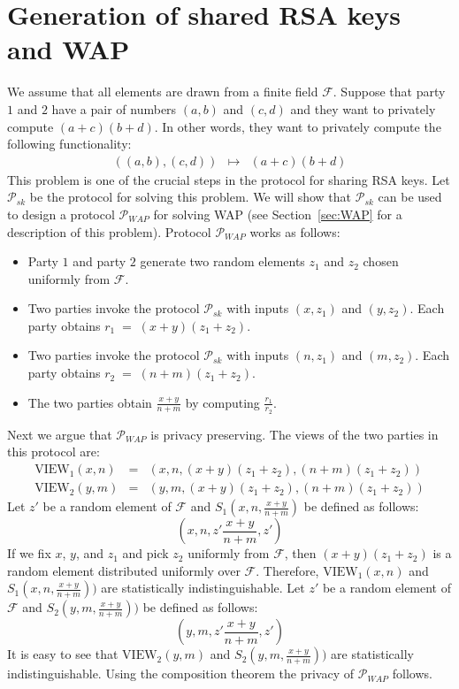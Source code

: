 
\section{Generation of shared RSA keys and WAP}
\label{sec:shared-RSA}

We assume that all elements are drawn from a finite field
$\mathcal{F}$.  Suppose that party $1$ and $2$ have a pair of numbers
$(a,b)$ and $(c,d)$ and they want to privately compute
$(a+c)(b+d)$. In other words, they want to privately compute the
following functionality:
\begin{eqnarray*}
((a,b),(c,d)) & \longmapsto & (a+c)(b+d)
\end{eqnarray*}
This problem is one of the crucial steps in the protocol for sharing
RSA keys. Let $\mathcal{P}_{sk}$ be the protocol for solving this
problem. We will show that $\mathcal{P}_{sk}$ can be used to design a
protocol $\mathcal{P}_{WAP}$ for solving WAP (see Section~\ref{sec:WAP} for a description
of this problem). Protocol $\mathcal{P}_{WAP}$ works as follows:

\begin{itemize}

\item Party $1$ and party $2$ generate two random elements $z_1$ and $z_2$ chosen
uniformly from $\mathcal{F}$.

\item Two parties invoke the protocol $\mathcal{P}_{sk}$ with inputs
$(x,z_1)$ and $(y,z_2)$. Each party obtains $r_1 \; = \; (x+y)(z_1+z_2)$.

\item Two parties invoke the protocol $\mathcal{P}_{sk}$ with inputs
$(n,z_1)$ and $(m,z_2)$. Each party obtains $r_2 \; = \; (n+m)(z_1+z_2)$.

\item The two parties obtain $\frac{x+y}{n+m}$ by computing $\frac{r_1}{r_2}$.

\end{itemize}

Next we argue that $\mathcal{P}_{WAP}$ is privacy preserving.  The
views of the two parties in this protocol are:
\begin{eqnarray*}
\mbox{VIEW}_1 (x,n) & = & (x,n,(x+y)(z_1+z_2),  (n+m)(z_1+z_2)) \\
\mbox{VIEW}_2 (y,m)  & = & (y,m,(x+y)(z_1+z_2),  (n+m)(z_1+z_2))
\end{eqnarray*}
Let $z'$ be a random element of $\mathcal{F}$ and $S_1 (x,n,\frac{x+y}{n+m})$
be defined as follows:
\[
(x,n, z' \frac{x+y}{n+m},z')
\]
If we fix $x$, $y$, and $z_1$ and pick $z_2$ uniformly from $\mathcal{F}$, then
$(x+y)(z_1+z_2)$ is a random element distributed uniformly over $\mathcal{F}$.
Therefore, $\mbox{VIEW}_1 (x,n)$ and $S_1
(x,n,\frac{x+y}{n+m}))$ are statistically indistinguishable. 
Let $z'$ be a random element of $\mathcal{F}$ and $S_2 (y,m,\frac{x+y}{n+m}))$
be defined as follows:
\[
(y,m, z' \frac{x+y}{n+m},z')
\]
It is easy to see that $\mbox{VIEW}_2 (y,m)$ and $S_2(y,m,\frac{x+y}{n+m}))$ 
are statistically indistinguishable. Using the composition theorem the 
privacy of $\mathcal{P}_{WAP}$ follows.




